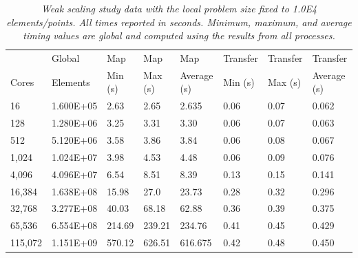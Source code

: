 \documentclass{mc2013}
\begin{document}
\begin{table}[htpb!]
  \begin{center}
    \begin{tabular}{llllllll}\hline\hline
      \multicolumn{1}{l}{} & 
      \multicolumn{1}{l}{Global} & 
      \multicolumn{1}{l}{Map} & 
      \multicolumn{1}{l}{Map} & 
      \multicolumn{1}{l}{Map} & 
      \multicolumn{1}{l}{Transfer} & 
      \multicolumn{1}{l}{Transfer} & 
      \multicolumn{1}{l}{Transfer}\\
      \multicolumn{1}{l}{Cores} & 
      \multicolumn{1}{l}{Elements} & 
      \multicolumn{1}{l}{Min (s)} & 
      \multicolumn{1}{l}{Max (s)} & 
      \multicolumn{1}{l}{Average (s)} & 
      \multicolumn{1}{l}{Min (s)} & 
      \multicolumn{1}{l}{Max (s)} & 
      \multicolumn{1}{l}{Average (s)}\\ \hline\hline
16 &	1.600E+05 & 2.63 &	2.65 &	  2.635 &	0.06 & 0.07 &	0.062 \\
128 &	1.280E+06 & 3.25 &	3.31 &	  3.30 &	0.06 &	0.07 &	0.063 \\
512 &	5.120E+06 & 3.58 &	3.86 &	  3.84 &	0.06 &	0.08 &	0.067 \\
1,024 &	1.024E+07 & 3.98 &	4.53 &    4.48 &	0.06 &	0.09 &	0.076 \\
4,096 &	4.096E+07 & 6.54 &	8.51 &	  8.39 &	0.13 &	0.15 &	0.141 \\
16,384 &	1.638E+08 & 15.98 &	27.0 &	  23.73 &	0.28 &	0.32 &	0.296 \\
32,768 &	3.277E+08 & 40.03 &	68.18 &   62.88 &	0.36 &	0.39 &	0.375 \\
65,536 &	6.554E+08 & 214.69 & 239.21	& 234.76 &	0.41 &	0.45 & 0.429 \\
115,072 & 1.151E+09 & 570.12 & 626.51	& 616.675 &	0.42 &	0.48 &	0.450 \\
      \hline\hline
    \end{tabular}
  \end{center}
  \caption{\sl Weak scaling study data with the local problem size
    fixed to 1.0E4 elements/points. All times reported in
    seconds. Minimum, maximum, and average timing values are global
    and computed using the results from all processes.}
  \label{tab:weak_scaling}
\end{table}
\end{document}
